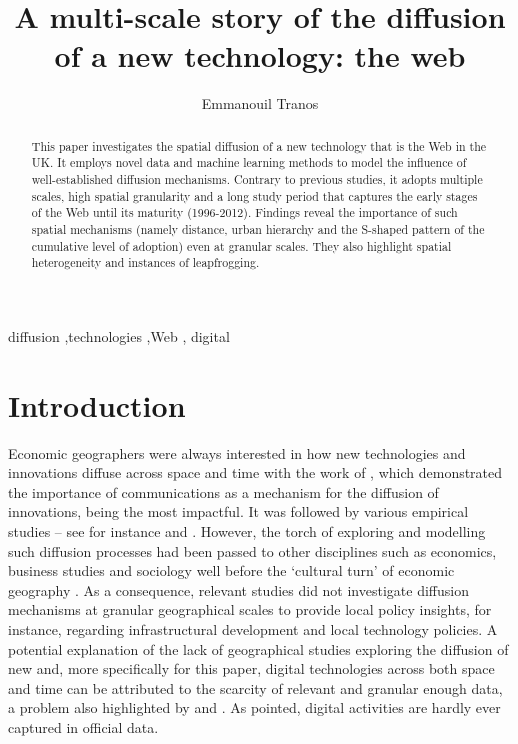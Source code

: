 \documentclass[
  authoryear,
  preprint,
  3p]{elsarticle}
\begin{document}
\begin{frontmatter}
\title{A multi-scale story of the diffusion of a new technology: the
web}
\author[1]{Emmanouil Tranos%
%
}



        
\begin{abstract}
This paper investigates the spatial diffusion of a new technology that
is the Web in the UK. It employs novel data and machine learning methods
to model the influence of well-established diffusion mechanisms.
Contrary to previous studies, it adopts multiple scales, high spatial
granularity and a long study period that captures the early stages of
the Web until its maturity (1996-2012). Findings reveal the importance
of such spatial mechanisms (namely distance, urban hierarchy and the
S-shaped pattern of the cumulative level of adoption) even at granular
scales. They also highlight spatial heterogeneity and instances of
leapfrogging.
\end{abstract}





\begin{keyword}
    diffusion \sep technologies \sep Web \sep 
    digital
\end{keyword}
\end{frontmatter}
    

\section{Introduction}\label{sec-introduction}

Economic geographers were always interested in how new technologies and
innovations diffuse across space and time with the work of
\citet{hagerstrand1968innovation}, which demonstrated the importance of
communications as a mechanism for the diffusion of innovations, being
the most impactful. It was followed by various empirical studies -- see
for instance \citet{ormrod1990} and \citet{iso2005}. However, the torch
of exploring and modelling such diffusion processes had been passed to
other disciplines such as economics, business studies and sociology well
before the `cultural turn' of economic geography
\citep{perkins2005international, ding2010modeling}. As a consequence,
relevant studies did not investigate diffusion mechanisms at granular
geographical scales to provide local policy insights, for instance,
regarding infrastructural development and local technology policies. A
potential explanation of the lack of geographical studies exploring the
diffusion of new and, more specifically for this paper, digital
technologies across both space and time can be attributed to the
scarcity of relevant and granular enough data, a problem also
highlighted by \citet{iso2005} and \citet{kemeny2011international}. As
\citet{zook2022mapping} pointed, digital activities are hardly ever
captured in official data.
\end{document}

